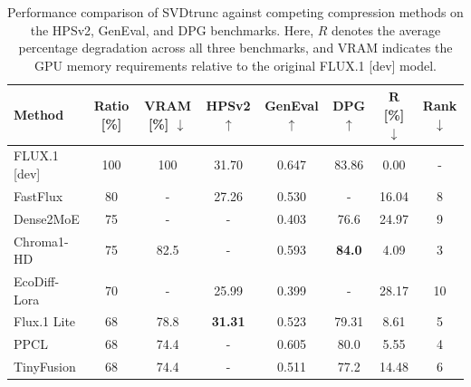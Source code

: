 \begin{table}[H]
	
	\centering
	\begin{threeparttable}
		\caption[Benchmark Performance: \gls{SVD}trunc vs. \gls{SOTA} Compression Methods on FLUX.1 {[dev]}]{Performance comparison of \gls{SVD}trunc against competing compression methods on the HPSv2, GenEval, and DPG benchmarks. Here, $R$ denotes the average percentage degradation across all three benchmarks, and \gls{VRAM} indicates the GPU memory requirements relative to the original FLUX.1 {[dev]} model.}
		\label{tab:CompetitorTable}
		\begin{tabular}{@{}lccccccc@{}}
			\toprule
			\textbf{Method}
			& \textbf{Ratio [\%]}
			& \textbf{VRAM [\%]} $\downarrow$
			& \textbf{HPSv2} $\uparrow$
			& \textbf{GenEval} $\uparrow$ 
			& \textbf{DPG} $\uparrow$  
			& $\boldsymbol{R}$ \textbf{ [\%]} $\downarrow$
			& \textbf{Rank} $\downarrow$
			\\ \midrule
			
			
			FLUX.1 {[dev]} 
			& 100  
			& 100 
			& 31.70 
			& 0.647 
			& 83.86 
			& 0.00
			& -
			\\  \midrule
			
			
			FastFlux\tnote{2} \cite{FastFlux} 
			& 80
			& -
			&  27.26 
			& 0.530 
			& - 
			& 16.04
			& 8
			\\
			
			
			Dense2MoE\tnote{1} \cite{Dense2MoE} 
			& 75
			& - 
			&  - 
			& 0.403 
			& 76.6 
			& 24.97
			& 9
			\\
			
			
			Chroma1-HD\tnote{1} \cite{rock2025chroma}
			& 75
			& 82.5
			& - 
			& 0.593 
			& \textbf{84.0} 
			& 4.09
			& 3
			\\
			
			
			EcoDiff-Lora \cite{EcoDiff}  
			& 70
			& - 
			& 25.99 
			& 0.399 
			& - 
			& 28.17
			& 10
			\\
			
			
			Flux.1 Lite \cite{flux1-lite} 
			& 68 
			& 78.8
			& \textbf{31.31} 
			& 0.523 
			& 79.31 
			& 8.61
			& 5
			\\
			
			
			PPCL\tnote{1} \cite{PPCL} 
			& 68
			& 74.4
			& - 
			& 0.605 
			& 80.0 
			& 5.55
			& 4
			\\
			
			
			TinyFusion\tnote{1} \cite{TinyFusion}  
			& 68
			& 74.4 
			& - 
			& 0.511
			& 77.2 
			& 14.48
			& 6
			\\
			

\end{tabular}
\end{threeparttable}
\end{table}
